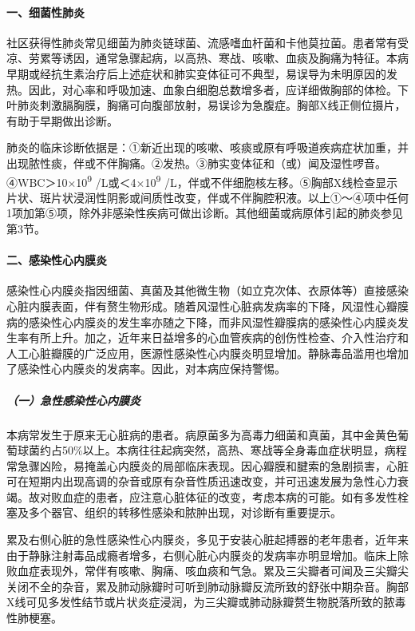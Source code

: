 \paragraph{一、细菌性肺炎}

社区获得性肺炎常见细菌为肺炎链球菌、流感嗜血杆菌和卡他莫拉菌。患者常有受凉、劳累等诱因，通常急骤起病，以高热、寒战、咳嗽、血痰及胸痛为特征。本病早期或经抗生素治疗后上述症状和肺实变体征可不典型，易误导为未明原因的发热。因此，对心率和呼吸加速、血象白细胞总数增多者，应详细做胸部的体检。下叶肺炎刺激膈胸膜，胸痛可向腹部放射，易误诊为急腹症。胸部X线正侧位摄片，有助于早期做出诊断。

肺炎的临床诊断依据是：①新近出现的咳嗽、咳痰或原有呼吸道疾病症状加重，并出现脓性痰，伴或不伴胸痛。②发热。③肺实变体征和（或）闻及湿性啰音。④WBC＞10×10\textsuperscript{9}
/L或＜4×10\textsuperscript{9}
/L，伴或不伴细胞核左移。⑤胸部X线检查显示片状、斑片状浸润性阴影或间质性改变，伴或不伴胸腔积液。以上①～④项中任何1项加第⑤项，除外非感染性疾病可做出诊断。其他细菌或病原体引起的肺炎参见第3节。

\paragraph{二、感染性心内膜炎}

感染性心内膜炎指因细菌、真菌及其他微生物（如立克次体、衣原体等）直接感染心脏内膜表面，伴有赘生物形成。随着风湿性心脏病发病率的下降，风湿性心瓣膜病的感染性心内膜炎的发生率亦随之下降，而非风湿性瓣膜病的感染性心内膜炎发生率有所上升。加之，近年来日益增多的心血管疾病的创伤性检查、介入性治疗和人工心脏瓣膜的广泛应用，医源性感染性心内膜炎明显增加。静脉毒品滥用也增加了感染性心内膜炎的发病率。因此，对本病应保持警惕。

\subparagraph{（一）急性感染性心内膜炎}

本病常发生于原来无心脏病的患者。病原菌多为高毒力细菌和真菌，其中金黄色葡萄球菌约占50\%以上。本病往往起病突然，高热、寒战等全身毒血症状明显，病程常急骤凶险，易掩盖心内膜炎的局部临床表现。因心瓣膜和腱索的急剧损害，心脏可在短期内出现高调的杂音或原有杂音性质迅速改变，并可迅速发展为急性心力衰竭。故对败血症的患者，应注意心脏体征的改变，考虑本病的可能。如有多发性栓塞及多个器官、组织的转移性感染和脓肿出现，对诊断有重要提示。

累及右侧心脏的急性感染性心内膜炎，多见于安装心脏起搏器的老年患者，近年来由于静脉注射毒品成瘾者增多，右侧心脏心内膜炎的发病率亦明显增加。临床上除败血症表现外，常伴有咳嗽、胸痛、咳血痰和气急。累及三尖瓣者可闻及三尖瓣尖关闭不全的杂音，累及肺动脉瓣时可听到肺动脉瓣反流所致的舒张中期杂音。胸部X线可见多发性结节或片状炎症浸润，为三尖瓣或肺动脉瓣赘生物脱落所致的脓毒性肺梗塞。

